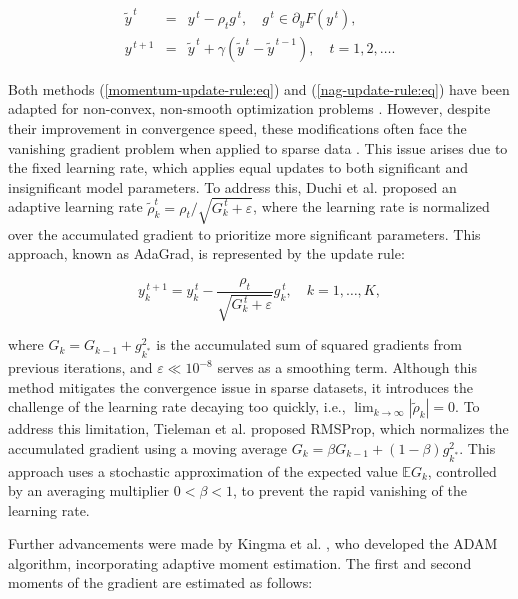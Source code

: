 \begin{eqnarray}
    \label{nag-update-rule:eq}
    \tilde{y}^{\,t} &=& y^{\,t} - \rho_t g^{\,t}, \quad g^{\,t} \in \partial_y F(y^{\,t}), \\
    y^{\,t+1} &=& \tilde{y}^{\,t} + \gamma (\tilde{y}^{\,t} - \tilde{y}^{\,t-1}), \quad t=1,2,\ldots.
\end{eqnarray}

Both methods (\ref{momentum-update-rule:eq}) and (\ref{nag-update-rule:eq}) have been adapted for non-convex, non-smooth optimization problems \cite{mikhalevich2024}. However, despite their improvement in convergence speed, these modifications often face the vanishing gradient problem when applied to sparse data \cite{Bottou_Curtis_Nocedal_2018}. This issue arises due to the fixed learning rate, which applies equal updates to both significant and insignificant model parameters. To address this, Duchi et al. \cite{Duchi_2011} proposed an adaptive learning rate $\tilde{\rho}_k^{t} = \rho_t / \sqrt{G_k^{\,t} + \varepsilon}$, where the learning rate is normalized over the accumulated gradient to prioritize more significant parameters. This approach, known as AdaGrad, is represented by the update rule:

\begin{equation}
    \label{adagrad-update-rule:eq}
    y^{\,t+1}_k = y^{\,t}_k - \frac{\rho_t}{\sqrt{G_k^{\,t} + \varepsilon}} g^{\,t}_k, \quad k=1,\ldots,K,
\end{equation}

\noindent where $G_k = G_{k-1} + g_{k^*}^2$ is the accumulated sum of squared gradients from previous iterations, and $\varepsilon \ll 10^{-8}$ serves as a smoothing term. Although this method mitigates the convergence issue in sparse datasets, it introduces the challenge of the learning rate decaying too quickly, i.e., $\lim_{k \to \infty} | \tilde{\rho}_k | = 0$. To address this limitation, Tieleman et al. \cite{tieleman2012rmsprop} proposed RMSProp, which normalizes the accumulated gradient using a moving average $G_k = \beta G_{k-1} + (1 - \beta) g_{k^*}^2$. This approach uses a stochastic approximation of the expected value $\mathbb{E} G_k$, controlled by an averaging multiplier $0 < \beta < 1$, to prevent the rapid vanishing of the learning rate.

Further advancements were made by Kingma et al. \cite{kingma2017adam}, who developed the ADAM algorithm, incorporating adaptive moment estimation. The first and second moments of the gradient are estimated as follows:

